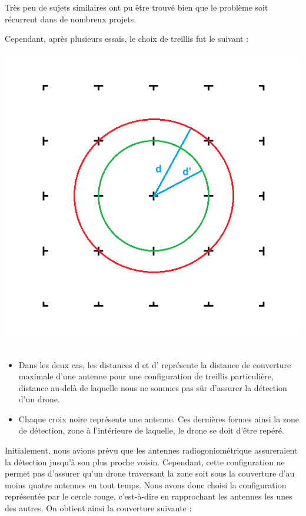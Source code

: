Très peu de sujets similaires ont pu être trouvé bien que le problème soit récurrent dans de
nombreux projets.

Cependant, après plusieurs essais, le choix de treillis fut le suivant :

\begin{minipage}{0.45\linewidth}

  \centering
  \includegraphics[width=\textwidth]{treillis_explication}
  ~\\
\end{minipage}
\begin{minipage}{0.45\linewidth}
  \begin{itemize}
  \item Dans les deux cas, les distances d et d’ représente la distance de couverture maximale d’une antenne pour une configuration de treillis particulière, distance au-delà de laquelle nous ne sommes pas sûr d’assurer la détection d’un drone.
  \item Chaque croix noire représente une antenne. Ces dernières formes ainsi la zone de détection, zone à l’intérieure de laquelle, le drone se doit d’être repéré.
  \end{itemize}
\end{minipage}


Initialement, nous avions prévu que les antennes radiogoniométrique assureraient la détection
jusqu’à son plus proche voisin. Cependant, cette configuration ne permet pas d’assurer qu’un drone
traversant la zone soit sous la couverture d’au moins quatre antennes en tout temps. Nous avons
donc choisi la configuration représentée par le cercle rouge, c’est-à-dire en rapprochant les antennes
les unes des autres. On obtient ainsi la couverture suivante :
~\\

